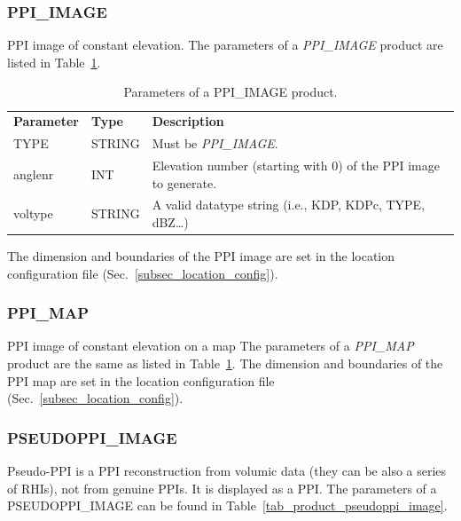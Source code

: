 \documentclass[a4paper,11pt,pdftex,twoside]{scrartcl}
\renewcommand{\bf}{\normalfont \bfseries}
\begin{document}
{{{\subsubsection{PPI\_IMAGE}
   \label{subsec_ppi_image}

 PPI image of constant elevation.
The parameters of a \emph{PPI\_IMAGE} product are listed in Table~\ref{tab_product_ppi_image}.

\begin{table}[H]
 \begin{tabularx}{\textwidth}{llX}
 \bf{Parameter}  & \bf{Type}  & \bf{Description}\\
 TYPE           & STRING     & Must be \emph{PPI\_IMAGE}.\\
 anglenr        & INT        & Elevation number (starting with 0) of the PPI image
                               to generate.\\
 voltype        & STRING     &  A valid datatype string (i.e., KDP, KDPc, TYPE, dBZ\dots)\\

 \end{tabularx}
 \caption{Parameters of a PPI\_IMAGE product.}
 \label{tab_product_ppi_image}
\end{table}
 The dimension and boundaries of the PPI image are set in the location configuration file (Sec.~\ref{subsec_location_config}).

\subsubsection{PPI\_MAP}
   \label{subsec_ppi_map}

 PPI image of constant elevation on a map
The parameters of a \emph{PPI\_MAP} product are the same as listed in Table~\ref{tab_product_ppi_image}.
 The dimension and boundaries of the PPI map are set in the location configuration file (Sec.~\ref{subsec_location_config}).


 \subsubsection{PSEUDOPPI\_IMAGE}
    \label{subsec_pseudoppi_image}
Pseudo-PPI is a PPI reconstruction from volumic data (they can be also a series of RHIs), not from genuine PPIs.
It is displayed as a PPI. The parameters of a PSEUDOPPI\_IMAGE can be found in Table~\ref{tab_product_pseudoppi_image}.

}}}
\end{document}
